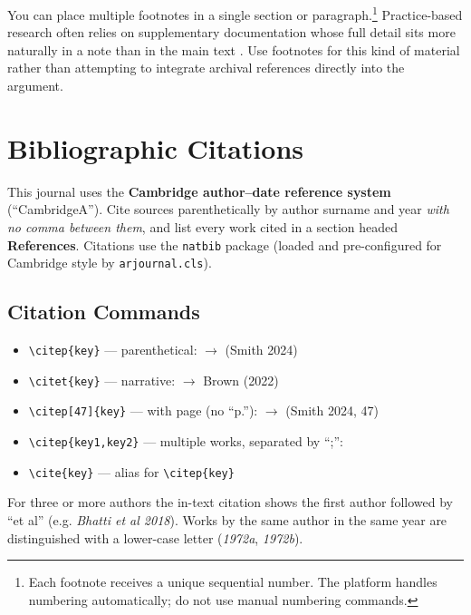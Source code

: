 You can place multiple footnotes in a single section or paragraph.\footnote{%
  Each footnote receives a unique sequential number. The platform handles
  numbering automatically; do not use manual numbering commands.%
}
Practice-based research often relies on supplementary documentation whose
full detail sits more naturally in a note than in the main text
\citep{nelson2013practice}. Use footnotes for this kind of material rather
than attempting to integrate archival references directly into the argument.

\section{Bibliographic Citations}

This journal uses the \textbf{Cambridge author--date reference system}
(``CambridgeA''). Cite sources parenthetically by author surname and year
\emph{with no comma between them}, and list every work cited in a section
headed \textbf{References}. Citations use the \texttt{natbib} package (loaded and
pre-configured for Cambridge style by \texttt{arjournal.cls}).

\subsection{Citation Commands}

\begin{itemize}
  \item \verb|\citep{key}| — parenthetical: \citep{smith2024art} $\rightarrow$ (Smith 2024)
  \item \verb|\citet{key}| — narrative: \citet{brown2022practice} $\rightarrow$ Brown (2022)
  \item \verb|\citep[47]{key}| — with page (no ``p.''): \citep[47]{smith2024art} $\rightarrow$ (Smith 2024, 47)
  \item \verb|\citep{key1,key2}| — multiple works, separated by ``;'': \citep{smith2024art,brown2022practice}
  \item \verb|\cite{key}| — alias for \verb|\citep{key}|
\end{itemize}

For three or more authors the in-text citation shows the first author followed
by ``et al'' (e.g. \emph{Bhatti et al 2018}). Works by the same author in the
same year are distinguished with a lower-case letter (\emph{1972a}, \emph{1972b}).

